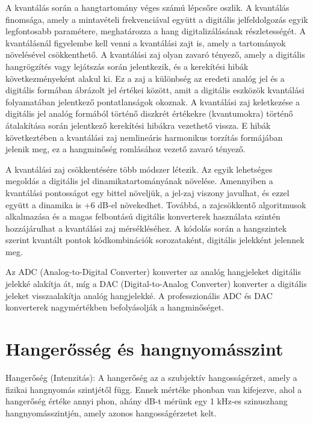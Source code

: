 A kvantálás során a hangtartomány véges számú lépcsőre oszlik. 
A kvantálás finomsága, amely a mintavételi frekvenciával együtt a digitális jelfeldolgozás 
egyik legfontosabb paramétere, meghatározza a hang digitalizálásának részletességét. 
A kvantálásnál figyelembe kell venni a kvantálási zajt is, amely a tartományok növelésével csökkenthető.
A kvantálási zaj olyan zavaró tényező, amely a digitális hangrögzítés vagy lejátszás során jelentkezik, 
és a kerekítési hibák következményeként alakul ki. Ez a zaj a különbség az eredeti analóg jel és a 
digitális formában ábrázolt jel értékei között, amit a digitális eszközök kvantálási folyamatában jelentkező pontatlanságok okoznak.
A kvantálási zaj keletkezése a digitális jel analóg formából történő diszkrét értékekre (kvantumokra) 
történő átalakítása során jelentkező kerekítési hibákra vezethető vissza. 
E hibák következtében a kvantálási zaj nemlineáris harmonikus torzítás formájában jelenik meg, ez a hangminőség romlásához vezető zavaró tényező.

A kvantálási zaj csökkentésére több módszer létezik. Az egyik lehetséges megoldás a 
digitális jel dinamikatartományának növelése. Amennyiben a kvantálási pontosságot 
egy bittel növeljük, a jel-zaj viszony javulhat, és ezzel együtt a dinamika is +6 dB-el növekedhet. 
Továbbá, a zajcsökkentő algoritmusok alkalmazása és a magas felbontású digitális konverterek használata szintén hozzájárulhat a kvantálási zaj mérsékléséhez.
A kódolás során a hangszintek szerint kvantált pontok kódkombinációk sorozataként, digitális jelekként jelennek meg.

Az ADC (Analog-to-Digital Converter) konverter az analóg hangjeleket digitális jelekké alakítja át, míg a DAC (Digital-to-Analog Converter) 
konverter a digitális jeleket visszaalakítja analóg hangjelekké. 
A professzionális ADC és DAC konverterek nagymértékben befolyásolják a hangminőséget.
\section{Hangerősség és hangnyomásszint} %
Hangerőség (Intenzitás):
A hangerőség az a szubjektív hangosságérzet, amely a fizikai hangnyomás szintjétől függ. 
Ennek mértéke phonban van kifejezve, ahol a hangerőség értéke annyi phon, ahány dB-t mérünk 
egy 1 kHz-es szinuszhang hangnyomásszintjén, amely azonos hangosságérzetet kelt.


